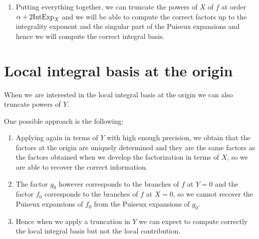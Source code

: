\documentclass[a4paper,11pt,reqno]{amsart}%
\theoremstyle{definition}
\theoremstyle{plain}
\theoremstyle{remark}
\newcommand\ct[1]{\text{\rmfamily\upshape #1}}
\newcommand{\IntExpX}{\ct{IntExp}_X}
\begin{document}
\begin{enumerate}
    \begin{enumerate}
    \item We apply Half-RNP algorithm (page 13) to one factor $F_i$.
    \item In this case $v_i = v_X({(F_i)}_Y)$ and this is smaller than $\IntExpX$ (the integrality exponent of one branch is smaller than that of the full polynomial).
    \item $r_i$ may not be smaller than the integrality exponent but we have $r_i \le \alpha$.
    \item So by the algorithm we need $n \ge v_i + r_i$, and $v_i + r_i \le \alpha + \IntExpX$. That is, we need the factors $F_i$ developed to degree $\alpha + \IntExpX$ and by Proposition \ref{prop:factors} we can get this by computing a factorization of $F$ modulo $\alpha + 2 \IntExpX$.
    \end{enumerate}

\item Putting everything together, we can truncate the powers of $X$ of $f$ at order $\alpha + 2 \IntExpX$ and we will be able to compute the correct factors up to the integrality exponent and the singular part of the Puiseux expansions and hence we will compute the correct integral basis.

\end{enumerate}

\section{Local integral basis at the origin}

When we are interested in the local integral basis at the origin we can also truncate powers of $Y$.

One possible approach is the following:
\begin{enumerate}
\item Applying again \cite[Proposition 23]{poteaux2021}  in terms of $Y$ with high enough precision, we obtain that the factors at the origin are uniquely determined and they are the same factors as the factors obtained when we develop the factorization in terms of $X$, so we are able to recover the correct information.
\item The factor $g_0$ however corresponds to the branches of $f$ at $Y = 0$ and the factor $f_0$ corresponds to the branches of $f$ at $X = 0$, so we cannot recover the Puiseux expansions of $f_0$ from the Puiseux expansions of $g_0$.
\item Hence when we apply a truncation in $Y$ we can expect to compute correctly the local integral basis but not the local contribution.
\end{enumerate}
\end{document}
